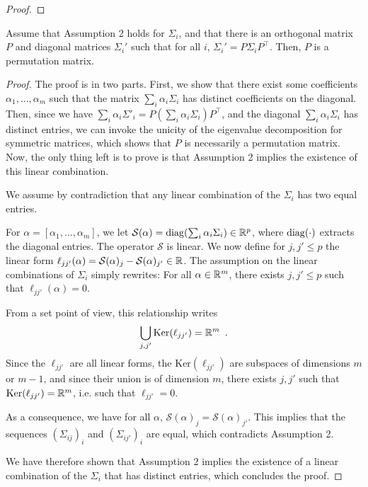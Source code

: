\documentclass{report}
\begin{document}
{\begin{proof}
\end{proof}

\begin{lemma}
\label{lemma:eigdecomp}
Assume that Assumption 2 holds for $\Sigma_i$, and that there is an orthogonal matrix $P$ and diagonal matrices $\Sigma_i'$ such that for all $i$, $\Sigma_i' = P\Sigma_iP^{\top}$. Then, $P$ is a permutation matrix.
\end{lemma}
\begin{proof}
The proof is in two parts. First, we show that there exist some coefficients $\alpha_1, \dots, \alpha_m$ such that the matrix $\sum_i\alpha_i\Sigma_i$ has distinct coefficients on the diagonal. Then, since we have $\sum_i\alpha_i\Sigma'_i = P\left(\sum_i\alpha_i\Sigma_i\right)P^{\top}$, and the diagonal $\sum_i\alpha_i\Sigma_i$ has distinct entries, we can invoke the unicity of the eigenvalue decomposition for symmetric matrices, which shows that $P$ is necessarily a permutation matrix.
Now, the only thing left is to prove is that Assumption 2 implies the existence of this linear combination.

We assume by contradiction that any linear combination of the $\Sigma_i$ has two equal entries.

For $\alpha = [\alpha_1, \dots, \alpha_m]$, we let $\mathcal{S}(\alpha) = {\rm diag}(\sum_i\alpha_i\Sigma_i)\in\mathbb{R}^p$, where ${\rm diag}(\cdot)$ extracts the diagonal entries. The operator $\mathcal{S}$ is linear.
%
We now define for $j, j'\leq p$ the linear form $\ell_{jj'}(\alpha) = \mathcal{S}(\alpha)_j - \mathcal{S}(\alpha)_{j'}\in\mathbb{R}$. The assumption on the linear combinations of $\Sigma_i$ simply rewrites:
For all $\alpha\in\mathbb{R}^m$, there exists $j, j'\leq p$ such that $\ell_{jj'}(\alpha) = 0$.

From a set point of view, this relationship writes
$$
\bigcup_{j, j'}\mathrm{Ker}(\ell_{jj'}) = \mathbb{R}^m\enspace.
$$
Since the $\ell_{jj'}$ are all linear forms, the $\mathrm{Ker}(\ell_{jj'})$ are subspaces of dimensions $m$ or $m-1$, and since their union is of dimension $m$, there exists $j, j'$ such that  $\mathrm{Ker}(\ell_{jj'}) = \mathbb{R}^m$, i.e. such that $\ell_{jj'} = 0$.

As a consequence, we have for all $\alpha$, $\mathcal{S}(\alpha)_j = \mathcal{S}(\alpha)_{j'}$. This implies that the sequences $(\Sigma_{ij})_i$ and $(\Sigma_{ij'})_i$ are equal, which contradicts Assumption 2.


We have therefore shown that Assumption 2 implies the existence of a linear combination of the $\Sigma_i$ that has distinct entries, which concludes the proof.
\end{proof}


}
\end{document}

